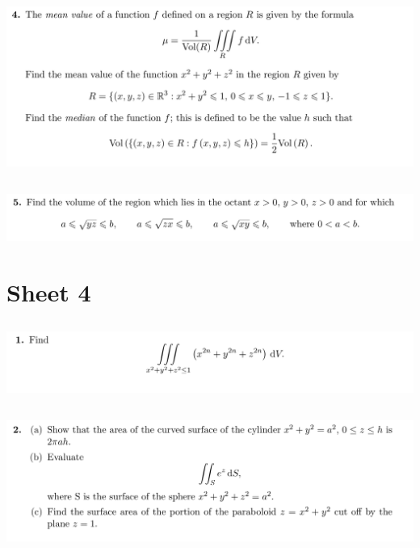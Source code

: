 \documentclass[12pt]{article}
\begin{document}
\subsection{}
\begin{mdframed}
  \includegraphics[width=400pt]{img/oxford-prelims-M5-multivariable-calc-3-4.png}
\end{mdframed}

\subsection{}
\begin{mdframed}
  \includegraphics[width=400pt]{img/oxford-prelims-M5-multivariable-calc-3-5.png}
\end{mdframed}


\newpage
\section{Sheet 4}

\subsection{}
\begin{mdframed}
  \includegraphics[width=400pt]{img/oxford-prelims-M5-multivariable-calc-4-1.png}
\end{mdframed}

\subsection{}
\begin{mdframed}
  \includegraphics[width=400pt]{img/oxford-prelims-M5-multivariable-calc-4-2.png}
\end{mdframed}
\end{document}
